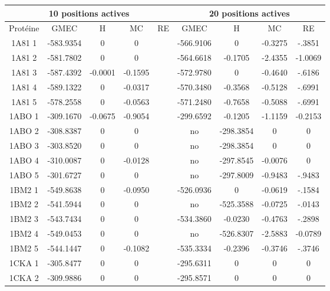 \documentclass[a4paper,12pt]{book}
\begin{document}
    \begin{table}[h]
      \centering

      \begin{tabular}{|c|c|c|c|c|c|c|c|c|}


        \hline
        \multicolumn{5}{|c|}{10 positions actives}  & \multicolumn{4}{|c|}{20 positions actives} \\
        \hline
        Protéine & GMEC & H & MC & RE & GMEC & H & MC & RE \\
        \hline
        1A81 1 & -583.9354 & 0 & 0 & & -566.9106 & 0 & -0.3275 & -.3851 \\             
        1A81 2 & -581.7802 & 0 & 0 & & -564.6618 & -0.1705 & -2.4355 & -1.0069 \\    
        1A81 3 & -587.4392 & -0.0001 & -0.1595 & & -572.9780 & 0 & -0.4640 & -.6186 \\       
        1A81 4 & -589.1322 & 0 & -0.0317 & & -570.3480 & -0.3568 & -0.5128 & -.6991 \\     
        1A81 5 & -578.2558 & 0 & -0.0563 & & -571.2480 & -0.7658 & -0.5088 & -.6991 \\     
        1ABO 1 & -309.1670 & -0.0675 & -0.9054 & & -299.6592 & -0.1205 & -1.1159 & -0.2153 \\    
        1ABO 2 & -308.8387 & 0 & 0 & & no & -298.3854 & 0 & 0 \\ 
        1ABO 3 & -303.8520 & 0 & 0 & & no & -298.3854 & 0 & 0 \\            
        1ABO 4 & -310.0087 & 0 & -0.0128 & & no & -297.8545 & -0.0076 & 0 \\          
        1ABO 5 & -301.6727 & 0 & 0 & & no & -297.8009 & -0.9483 & -.9483 \\       
        1BM2 1 & -549.8638 & 0 & -0.0950 & &   -526.0936 & 0 & -0.0619 & -.1584 \\        
        1BM2 2 & -541.5944 & 0 & 0 & & no & -525.3588 & -0.0725 & -.0143 \\       
        1BM2 3 & -543.7434 & 0 & 0 & & -534.3860 & -0.0230 & -0.4763 & -.2898 \\     
        1BM2 4 & -549.0453 & 0 & 0 & & no & -526.8307 & -2.5883 & -0.0789 \\       
        1BM2 5 & -544.1447 & 0 & -0.1082 & & -535.3334 & -0.2396 & -0.3746 & -.3746 \\     
        1CKA 1 & -305.8477 & 0 & 0 & & -295.6311 & 0 & 0 & 0\\  
        1CKA 2 & -309.9886 & 0 & 0 & & -295.8571 & 0 & 0 & 0 \\ 

\end{tabular}
\end{table}
\end{document}
